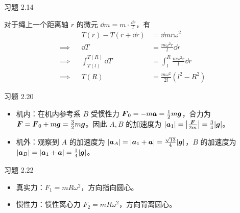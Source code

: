 \begin{problem}
    习题 2.14
    \begin{solution}
        对于绳上一个距离轴 $r$ 的微元 $\dd{m} = m \cdot \frac{\dd{r}}{l}$，有
        $$
        \begin{aligned}
            & & T(r) - T(r + \dd{r}) & = \dd{m} r \omega^2 \\
            \implies & & \dd{T} & = \frac{m \omega^2 r}{l} \dd{r} \\
            \implies & & \int_{T(l)}^{T(R)} \dd{T} & = \int_l^R \frac{m \omega^2 r}{l} \dd{r} \\
            \implies & & T(R) & = \frac{m \omega^2}{2l} (l^2 - R^2)
        \end{aligned}
        $$
    \end{solution}
\end{problem}

\begin{problem}
    习题 2.20
    \begin{solution}
        \begin{itemize}
            \item 机内：在机内参考系 $B$ 受惯性力 $\boldsymbol{F}_0 = -m \boldsymbol{a} = \frac{1}{2} m \boldsymbol{g}$，合力为 $\boldsymbol{F} = \boldsymbol{F}_0 + m \boldsymbol{g} = \frac{3}{2} m \boldsymbol{g}$。因此 $A, B$ 的加速度为 $\abs{\boldsymbol{a}_1} = \abs{\frac{\boldsymbol{F}}{2m}} = \frac{3}{4} \abs{\boldsymbol{g}}$。
            \item 机外：观察到 $A$ 的加速度为 $\abs{\boldsymbol{a}_A} = \abs{\boldsymbol{a}_1 + \boldsymbol{a}} = \frac{\sqrt{13}}{4} \abs{\boldsymbol{g}}$，$B$ 的加速度为 $\abs{\boldsymbol{a}_B} = \abs{\boldsymbol{a}_1 + \boldsymbol{a}} = \frac{1}{4} \abs{\boldsymbol{g}}$。
        \end{itemize}
    \end{solution}    
\end{problem}

\begin{problem}
    习题 2.22
    \begin{solution}
        \begin{itemize}
            \item 真实力：$F_1 = m R \omega^2$，方向指向圆心。
            \item 惯性力：惯性离心力 $F_2 = m R \omega^2$，方向背离圆心。
        \end{itemize}
    \end{solution}
\end{problem}

